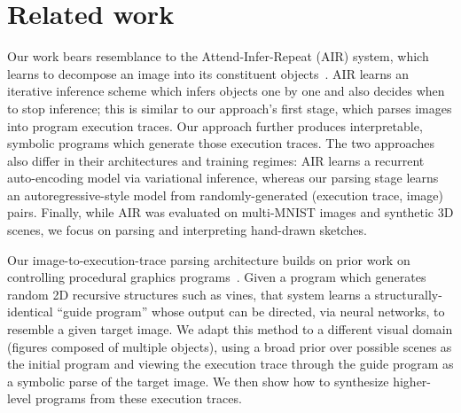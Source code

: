 \documentclass{article}
\newcommand{\remark}[1]{\textcolor{red}{[#1]}}
\begin{document}


\section{Related work}

Our work bears resemblance to the Attend-Infer-Repeat (AIR) system, which learns to decompose an image into its constituent objects~\cite{eslami1603attend}. AIR learns an iterative inference scheme which infers objects one by one and also decides when to stop inference; this is similar to our approach's first stage, which parses images into program execution traces. Our approach further produces interpretable, symbolic programs which generate those execution traces. The two approaches also differ in their architectures and training regimes: AIR learns a recurrent auto-encoding model via variational inference, whereas our parsing stage learns an autoregressive-style model from randomly-generated (execution trace, image) pairs. Finally, while AIR was evaluated on multi-MNIST images and synthetic 3D scenes, we focus on parsing and interpreting hand-drawn sketches.

Our image-to-execution-trace parsing architecture builds on prior work on controlling procedural graphics programs~\cite{ritchie2016neurally}. Given a program which generates random 2D recursive structures such as vines, that system learns a structurally-identical ``guide program'' whose output can be directed, via neural networks, to resemble a given target image. 
We adapt this method to a different visual domain (figures composed of multiple objects), using a broad prior over possible scenes as the initial program and viewing the execution trace through the guide program as a symbolic parse of the target image.
We then show how to synthesize higher-level programs from these execution traces.
\end{document}
